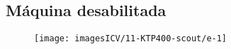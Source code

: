 \usepackage{graphicx}
\usepackage{wasysym}
\newpage
\thispagestyle{fancy}
\vspace{\fill}

\subsection{\small Máquina desabilitada}
\begin{figure}
    \centering
    \texttt{[image: imagesICV/11-KTP400-scout/e-1]}
    \caption{}
\end{figure}

